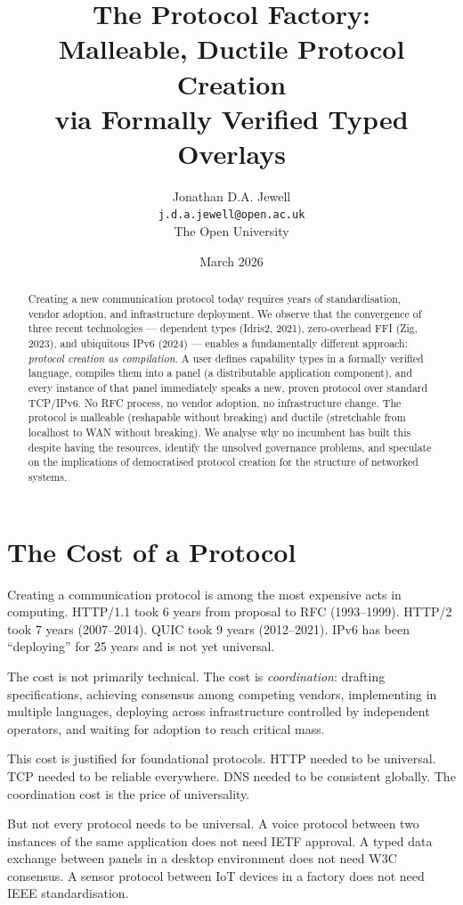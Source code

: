 \documentclass[11pt,a4paper]{article}
\title{The Protocol Factory:\\
Malleable, Ductile Protocol Creation\\
via Formally Verified Typed Overlays}
\author{Jonathan D.A. Jewell\\
\texttt{j.d.a.jewell@open.ac.uk}\\
The Open University}
\date{March 2026}
\begin{document}
\maketitle

\begin{abstract}
Creating a new communication protocol today requires years of
standardisation, vendor adoption, and infrastructure deployment.
We observe that the convergence of three recent technologies ---
dependent types (Idris2, 2021), zero-overhead FFI (Zig, 2023), and
ubiquitous IPv6 (2024) --- enables a fundamentally different approach:
\emph{protocol creation as compilation}. A user defines capability types
in a formally verified language, compiles them into a panel (a
distributable application component), and every instance of that panel
immediately speaks a new, proven protocol over standard TCP/IPv6. No
RFC process, no vendor adoption, no infrastructure change. The protocol
is malleable (reshapable without breaking) and ductile (stretchable from
localhost to WAN without breaking). We analyse why no incumbent has built
this despite having the resources, identify the unsolved governance
problems, and speculate on the implications of democratised protocol
creation for the structure of networked systems.
\end{abstract}

\section{The Cost of a Protocol}

Creating a communication protocol is among the most expensive acts in
computing. HTTP/1.1 took 6 years from proposal to RFC (1993--1999).
HTTP/2 took 7 years (2007--2014). QUIC took 9 years (2012--2021). IPv6
has been ``deploying'' for 25 years and is not yet universal.

The cost is not primarily technical. The cost is \emph{coordination}:
drafting specifications, achieving consensus among competing vendors,
implementing in multiple languages, deploying across infrastructure
controlled by independent operators, and waiting for adoption to reach
critical mass.

This cost is justified for foundational protocols. HTTP needed to be
universal. TCP needed to be reliable everywhere. DNS needed to be
consistent globally. The coordination cost is the price of universality.

But not every protocol needs to be universal. A voice protocol between
two instances of the same application does not need IETF approval. A
typed data exchange between panels in a desktop environment does not need
W3C consensus. A sensor protocol between IoT devices in a factory does
not need IEEE standardisation.
\end{document}
